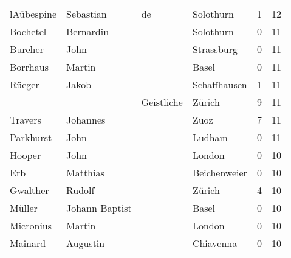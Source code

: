 \documentclass[10pt,a4paper,landscape]{article}
\begin{document}
\begin{longtable}{llllrr}
               lAübespine &                          Sebastian &          de &                                   Solothurn &          1 &        12 \\
                 Bochetel &                          Bernardin &             &                                   Solothurn &          0 &        11 \\
                  Bureher &                               John &             &                                  Strassburg &          0 &        11 \\
                 Borrhaus &                             Martin &             &                                       Basel &          0 &        11 \\
                   Rüeger &                              Jakob &             &                                Schaffhausen &          1 &        11 \\
                          &                                    &  Geistliche &                                      Zürich &          9 &        11 \\
                  Travers &                           Johannes &             &                                        Zuoz &          7 &        11 \\
                Parkhurst &                               John &             &                                      Ludham &          0 &        11 \\
                   Hooper &                               John &             &                                      London &          0 &        10 \\
                      Erb &                           Matthias &             &                                Beichenweier &          0 &        10 \\
                 Gwalther &                             Rudolf &             &                                      Zürich &          4 &        10 \\
                   Müller &                     Johann Baptist &             &                                       Basel &          0 &        10 \\
                Micronius &                             Martin &             &                                      London &          0 &        10 \\
                  Mainard &                           Augustin &             &                                   Chiavenna &          0 &        10 \\

\end{longtable}
\end{document}

